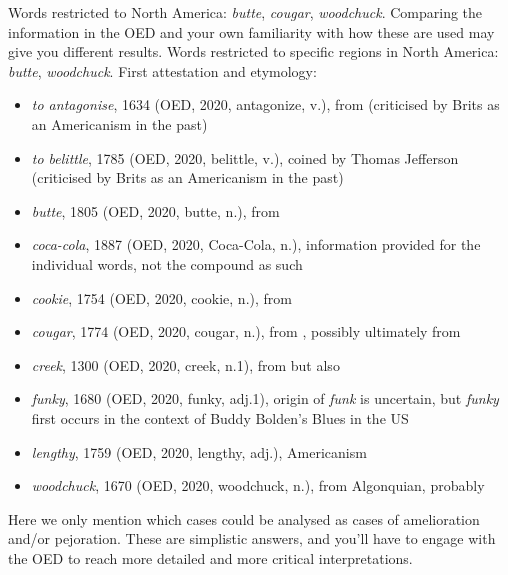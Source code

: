 \noindent Words restricted to North America: \textit{butte}, \textit{cougar}, \textit{woodchuck}. Comparing the information in the OED and your own familiarity with how these are used may give you different results. Words restricted to specific regions in North America: \textit{butte}, \textit{woodchuck}. First attestation and etymology:
\begin{itemize}
    \item \textit{to antagonise}, 1634 (OED, 2020,  antagonize, v.), from  (criticised by Brits as an Americanism in the past)
    \item \textit{to belittle}, 1785 (OED, 2020,  belittle, v.), coined by Thomas Jefferson (criticised by Brits as an Americanism in the past)
    \item \textit{butte}, 1805 (OED, 2020,  butte, n.), from 
    \item \textit{coca-cola}, 1887 (OED, 2020,  Coca-Cola, n.), information provided for the individual words, not the compound as such
    \item \textit{cookie}, 1754 (OED, 2020,  cookie, n.), from 
    \item \textit{cougar}, 1774 (OED, 2020,  cougar, n.), from , possibly ultimately from 
    \item \textit{creek}, 1300 (OED, 2020,  creek, n.1), from  but also 
    \item \textit{funky}, 1680 (OED, 2020,  funky, adj.1), origin of \textit{funk} is uncertain, but \textit{funky} first occurs in the context of Buddy Bolden's Blues in the US
    \item \textit{lengthy}, 1759 (OED, 2020,  lengthy, adj.), Americanism
    \item \textit{woodchuck}, 1670 (OED, 2020,  woodchuck, n.), from Algonquian, probably 
\end{itemize}


\noindent\textbf{}

\noindent Here we only mention which cases could be analysed as cases of amelioration and/or pejoration. These are simplistic answers, and you'll have to engage with the OED to reach more detailed and more critical interpretations.


